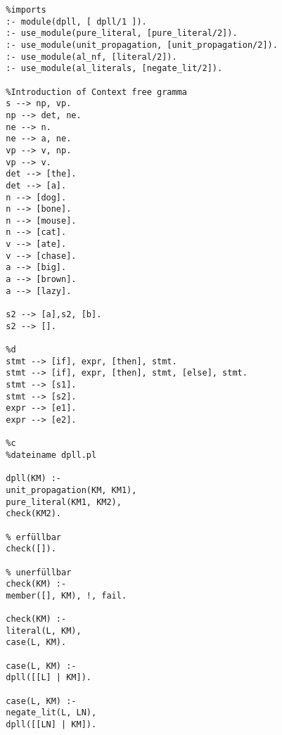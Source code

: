 \documentclass[a4paper,10pt]{article}
\begin{document}
	\begin{verbatim}
		%imports
		:- module(dpll, [ dpll/1 ]).
		:- use_module(pure_literal, [pure_literal/2]).
		:- use_module(unit_propagation, [unit_propagation/2]).
		:- use_module(al_nf, [literal/2]).
		:- use_module(al_literals, [negate_lit/2]).
		
		%Introduction of Context free gramma
		s --> np, vp.
		np --> det, ne.
		ne --> n.
		ne --> a, ne.
		vp --> v, np.
		vp --> v.
		det --> [the].
		det --> [a].
		n --> [dog].
		n --> [bone].
		n --> [mouse].
		n --> [cat].
		v --> [ate].
		v --> [chase].
		a --> [big].
		a --> [brown].
		a --> [lazy].
		
		s2 --> [a],s2, [b].
		s2 --> [].
		
		%d
		stmt --> [if], expr, [then], stmt.
		stmt --> [if], expr, [then], stmt, [else], stmt.
		stmt --> [s1].
		stmt --> [s2].
		expr --> [e1].
		expr --> [e2].
		
		%c
		%dateiname dpll.pl
		
		dpll(KM) :-
		unit_propagation(KM, KM1),
		pure_literal(KM1, KM2),
		check(KM2).
		
		% erfüllbar
		check([]).
		
		% unerfüllbar
		check(KM) :- 
		member([], KM), !, fail.
		
		check(KM) :-
		literal(L, KM),
		case(L, KM).
		
		case(L, KM) :-
		dpll([[L] | KM]).
		
		case(L, KM) :-
		negate_lit(L, LN),
		dpll([[LN] | KM]).
	\end{verbatim}
\end{document}
